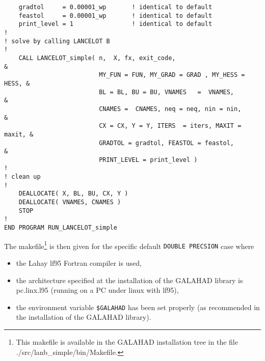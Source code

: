 \documentclass{article}
\begin{document}
\begin{lstlisting}
    gradtol     = 0.00001_wp       ! identical to default
    feastol     = 0.00001_wp       ! identical to default
    print_level = 1                ! identical to default
!
! solve by calling LANCELOT B
!
    CALL LANCELOT_simple( n,  X, fx, exit_code,                          &
                          MY_FUN = FUN, MY_GRAD = GRAD , MY_HESS = HESS, &
                          BL = BL, BU = BU, VNAMES   =  VNAMES,          &
                          CNAMES =  CNAMES, neq = neq, nin = nin,        &
                          CX = CX, Y = Y, ITERS  = iters, MAXIT = maxit, &
                          GRADTOL = gradtol, FEASTOL = feastol,          &
                          PRINT_LEVEL = print_level )
!
! clean up
!
    DEALLOCATE( X, BL, BU, CX, Y )
    DEALLOCATE( VNAMES, CNAMES )
    STOP
!
END PROGRAM RUN_LANCELOT_simple
\end{lstlisting}

\noindent
The makefile\footnote{This makefile is available
in the {\sf GALAHAD} installation tree in the file
./src/lanb\_simple/bin/Makefile.} is then given for the specific default 
{\tt DOUBLE PRECSION} case where
\begin{itemize}
\item the Lahay lf95 Fortran compiler is used,
\item the architecture specified at the installation of the
{\sf GALAHAD} library is pc.linx.l95 (running on a PC under linux with lf95),
\item the environment variable {\tt \$GALAHAD} has been set properly
(as recommended in the installation of the {\sf GALAHAD} library).
\end{itemize}
\end{document}
